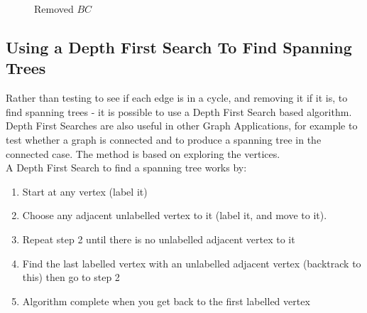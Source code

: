 \begin{minipage}[b][][b]{0.3\textwidth}
    \begin{figure}[H]
        \centering
        \caption{Removed $BC$}
    \end{figure}
\end{minipage} \vspace{0.5em}

\subsection{Using a Depth First Search To Find Spanning Trees}
Rather than testing to see if each edge is in a cycle, and removing it if it is, to find spanning trees - it is possible to use a Depth First Search based algorithm. Depth First Searches are also useful in other Graph Applications, for example to test whether a graph is connected and to produce a spanning tree in the connected case. The method is based on exploring the vertices.\\

A Depth First Search to find a spanning tree works by:
\begin{enumerate}
    \item Start at any vertex (label it)
    \item Choose any adjacent unlabelled vertex to it (label it, and move to it).
    \item Repeat step 2 until there is no unlabelled adjacent vertex to it
    \item Find the last labelled vertex with an unlabelled adjacent vertex (backtrack to this) then go to step 2
    \item Algorithm complete when you get back to the first labelled vertex
\end{enumerate}

